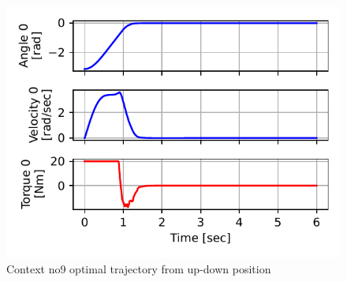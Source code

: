 \begin{figure}[p]
\begin{center}
\includegraphics[width=0.99\linewidth]{fig/c9_traj.pdf}
\caption{Context no9 optimal trajectory from up-down position}\label{fig:c9_traj}
\end{center}
\end{figure}



